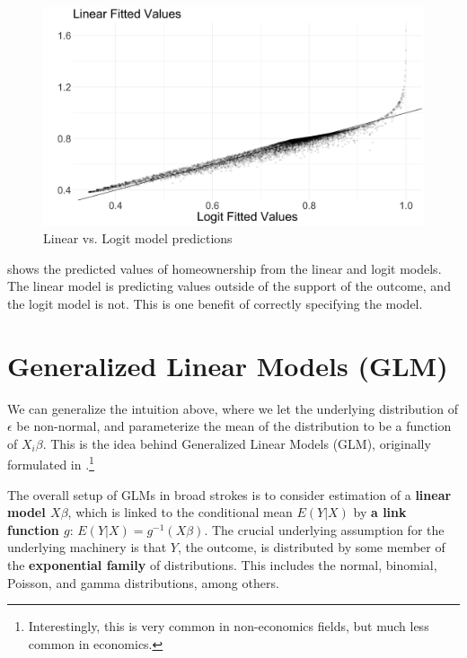 \documentclass{tufte-handout}
\theoremstyle{break}
\newcommand{\continuation}{??}
\newenvironment{continueexample}[1]
 {\renewcommand{\continuation}{\ref{#1}}\excont[continued]}
 {\endexcont}
\begin{document}
\begin{figure}
    \caption{Linear vs. Logit model predictions}
    \label{fig:linear_v_logit}
    \includegraphics[width=\linewidth]{../lectures/images/linear_v_logit_scatter.png}
    \end{figure}
  
\begin{boxD}
    \begin{continueexample}{example:homeownership}
         shows the predicted values of homeownership from the linear and logit models.  The linear model is predicting values outside of the support of the outcome, and the logit model is not.  This is one benefit of correctly specifying the model. 
    \end{continueexample}
\end{boxD}
  
\section{Generalized Linear Models (GLM)}
We can generalize the intuition above, where we let the underlying distribution of $\epsilon$ be non-normal, and parameterize the mean of the distribution to be a function of $X_{i}\beta$. This is the idea behind Generalized Linear Models (GLM), originally formulated in \citet{nelder1972generalized}.\footnote{Interestingly, this is very common in non-economics fields, but much less common in economics.} 

The overall setup of GLMs in broad strokes is to consider estimation of a \textbf{linear model $X\beta$}, which is linked to the conditional mean $E(Y|X)$ by \textbf{a link function $g$}: $E(Y|X) = g^{-1}(X\beta)$. The crucial underlying assumption for the underlying machinery is that $Y$, the outcome, is distributed by some member of the \textbf{exponential family} of distributions. This includes the normal, binomial, Poisson, and gamma distributions, among others.
\end{document}
